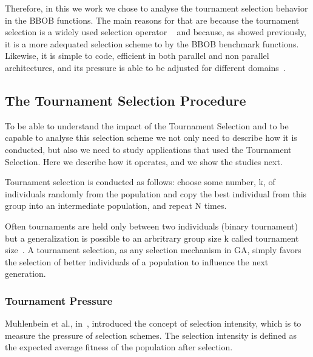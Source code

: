 Therefore, in this we work we chose to analyse the tournament selection behavior in the BBOB functions. The main reasons for that are because the tournament selection is a widely used selection operator ~\cite{goldberg1991real, goldberg1993toward, agrawal1995simulated, harik1999gambler, tsutsui1999multi, harik1999compact, deb2000efficient, beyer2001self,kaelo2007integrated, bhunia2009application,  nicolau2009application, sawyerr2011comparative, ecta14, sawyerr2015benchmarking} and because, as showed previously, it is a more adequated selection scheme to by the BBOB benchmark functions. Likewise, it is simple to code, efficient in both parallel and non parallel architectures, and its pressure is able to be adjusted for different domains~\cite{miller1995genetic}.



\subsection{The Tournament Selection Procedure}\label{sec:background:tournament_selection} 

To be able to understand the impact of the Tournament Selection and to be capable to analyse this selection scheme we not only need to describe how it is conducted, but also we need to study applications that used the Tournament Selection. Here we describe how it operates, and we show the studies next.

Tournament selection is conducted as follows: choose some number, k, of individuals randomly from the population and copy the best individual from this group into an intermediate population, and repeat N times. 

Often tournaments are held only between two individuals (binary tournament) but a generalization is possible to an arbritrary group size k called tournament size~\cite{blickle1995mathematical, goldberg1991comparative}. A tournament selection, as any selection mechanism in GA, simply favors the selection of better individuals of a population to influence the next generation. 


\subsubsection{Tournament Pressure}\label{sec:background:tournament_pressure} 
Muhlenbein et al., in~\cite{muhlenbein1993predictive}, introduced the concept of selection intensity, which is to measure the pressure of selection schemes. The selection intensity is defined as the expected average fitness of the population after selection. 


